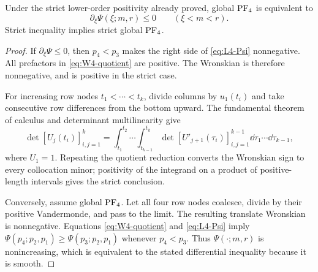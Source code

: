\begin{proposition}\label{prop:equivalence}
Under the strict lower-order positivity already proved, global \(\mathrm{PF}_4\) is
equivalent to
\[
 \partial_\xi\Psi(\xi;m,r)\leq0\qquad(\xi<m<r).
\]
Strict inequality implies strict global \(\mathrm{PF}_4\).
\end{proposition}

\begin{proof}
If \(\partial_\xi\Psi\leq0\), then \(p_4<p_3\) makes the right side of
\eqref{eq:L4-Psi} nonnegative. All prefactors in
\eqref{eq:W4-quotient} are positive. The Wronskian is therefore
nonnegative, and is positive in the strict case.

For increasing row nodes \(t_1<\cdots<t_k\), divide columns by \(u_1(t_i)\)
and take consecutive row differences from the bottom upward. The fundamental
theorem of calculus and determinant multilinearity give
\[
 \det[U_j(t_i)]_{i,j=1}^k
 =\int_{t_1}^{t_2}\!\cdots\!\int_{t_{k-1}}^{t_k}
 \det[U'_{j+1}(\tau_i)]_{i,j=1}^{k-1}
 \dd\tau_1\cdots\dd\tau_{k-1},
\]
where \(U_1=1\). Repeating the quotient reduction converts the Wronskian sign
to every collocation minor; positivity of the integrand on a product of
positive-length intervals gives the strict conclusion.

Conversely, assume global \(\mathrm{PF}_4\). Let all four row nodes coalesce, divide
by their positive Vandermonde, and pass to the limit. The resulting translate
Wronskian is nonnegative. Equations \eqref{eq:W4-quotient} and
\eqref{eq:L4-Psi} imply
\(\Psi(p_4;p_2,p_1)\geq\Psi(p_3;p_2,p_1)\) whenever \(p_4<p_3\).
Thus \(\Psi(\cdot;m,r)\) is nonincreasing, which is equivalent to the stated
differential inequality because it is smooth.
\end{proof}

